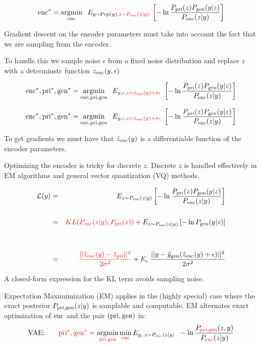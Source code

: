 {

$$\mathrm{enc}^* = \operatorname*{argmin}_{\mathrm{enc}}\;\;E_{y\sim \mathrm{Pop}(y),{\color{red} z\sim P_{\mathrm{enc}}(z|y)}}\;\left[- \ln \frac{P_{\mathrm{pri}}(z)P_{\mathrm{gen}}(y|z)}{P_{\mathrm{enc}}(z|y)}\right]$$

\vfill
Gradient descent on the encoder parameters must take into account the fact that we are sampling from the encoder.

\vfill
To handle this we sample noise $\epsilon$ from a fixed noise distribution and replace $z$ with a determinstc function $z_{\mathrm{enc}}(y,\epsilon)$

\vfill
$$\mathrm{enc}^*,\mathrm{pri}^*,\mathrm{gen}^* = \operatorname*{argmin}_{\mathrm{enc},\mathrm{pri},\mathrm{gen}}\;\;E_{y,{\color{red} \epsilon,z=\hat{z}_{\mathrm{enc}}(y)+\sigma\epsilon}}\;\left[- \ln \frac{P_{\mathrm{pri}}(z)P_{\mathrm{gen}}(y|z)}{P_{\mathrm{enc}}(z|y)}\right]$$


$$\mathrm{enc}^*,\mathrm{pri}^*,\mathrm{gen}^* = \operatorname*{argmin}_{\mathrm{enc},\mathrm{pri},\mathrm{gen}}\;\;E_{y,{\color{red} \epsilon,z=\hat{z}_{\mathrm{enc}}(y)+\sigma\epsilon}}\;\left[- \ln \frac{P_{\mathrm{pri}}(z)P_{\mathrm{gen}}(y|z)}{P_{\mathrm{enc}}(z|y)}\right]$$

\vfill
To get gradients we must have that $\hat{z}_{\mathrm{enc}}(y)$ is a differentiable function of the encoder parameters.

\vfill
Optimizing the encoder is tricky for discrete $z$.  Discrete $z$ is handled effectively in EM algorithms and general vector quantization (VQ) methods.

\vfill
\begin{eqnarray*}
{\cal L}(y) & = & E_{z \sim P_{\mathrm{enc}}(z|y)}\left[ - \ln \frac{P_{\mathrm{pri}}(z)P_{\mathrm{gen}}(y|z)}{P_{\mathrm{enc}}(z|y)}\right] \\
\\
& = & {\color{red} KL(P_{\mathrm{enc}}(z|y),P_{\mathrm{pri}}(z))} + E_{z \sim P_{\mathrm{enc}}(z|y)}\left[- \ln P_{\mathrm{gen}}(y|z)\right] \\
\\
\\
&=& {\color{red} \frac{||\hat{z}_{\mathrm{enc}}(y) - \hat{z}_{\mathrm{pri}}||^2}{2\sigma^2}} + E_\epsilon\;\frac{||y - \hat{y}_{\mathrm{gen}}(\hat{z}_{\mathrm{enc}}(y) + \epsilon)||^2}{2\sigma^2}
\end{eqnarray*}

\vfill
A closed-form expression for the KL term avoids sampling noise.


Expectation Maximimization (EM) applies in the (highly special) case where the exact posterior $P_{\mathrm{pri},\mathrm{gen}}(z|y)$ is samplable and computable.
EM alternates exact optimization of $\mathrm{enc}$ and the pair $(\mathrm{pri},\mathrm{gen})$ in:
$$\mbox{VAE:}\;\;\;\;\;\;\; {\color{red} \mathrm{pri}^*,\mathrm{gen}^*} = \operatorname*{argmin}_{\color{red} \mathrm{pri},\mathrm{gen}} \min_{\color{red} \mathrm{enc}} E_{y,\;z \sim P_{\color{red} \mathrm{enc}}(z|y)}\;\;- \ln \frac{P_{\color{red} \mathrm{pri},\mathrm{gen}}(z,y)}{P_{\color{red} \mathrm{enc}}(z|y)}$$

}

